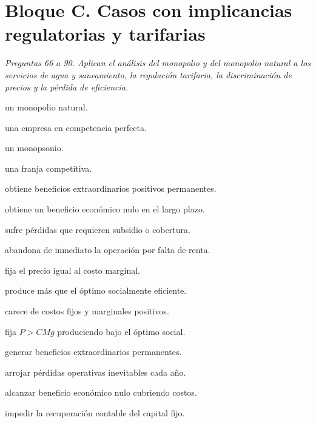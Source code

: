 \section*{Bloque C. Casos con implicancias regulatorias y tarifarias}

\noindent\textit{Preguntas 66 a 90. Aplican el análisis del monopolio y del monopolio natural a los servicios de agua y saneamiento, la regulación tarifaria, la discriminación de precios y la pérdida de eficiencia.}

\begin{opts}
    \item un monopolio natural.
    \item una empresa en competencia perfecta.
    \item un monopsonio.
    \item una franja competitiva.
\end{opts}

\begin{opts}
    \item obtiene beneficios extraordinarios positivos permanentes.
    \item obtiene un beneficio económico nulo en el largo plazo.
    \item sufre pérdidas que requieren subsidio o cobertura.
    \item abandona de inmediato la operación por falta de renta.
\end{opts}

\begin{opts}
    \item fija el precio igual al costo marginal.
    \item produce más que el óptimo socialmente eficiente.
    \item carece de costos fijos y marginales positivos.
    \item fija $P>CMg$ produciendo bajo el óptimo social.
\end{opts}

\begin{opts}
    \item generar beneficios extraordinarios permanentes.
    \item arrojar pérdidas operativas inevitables cada año.
    \item alcanzar beneficio económico nulo cubriendo costos.
    \item impedir la recuperación contable del capital fijo.
\end{opts}

